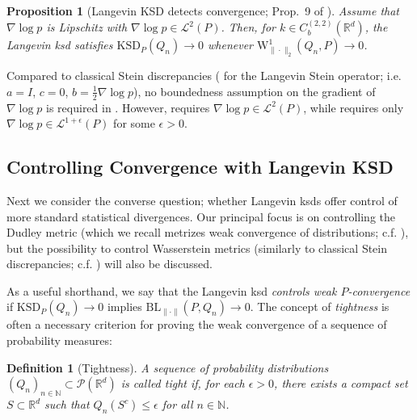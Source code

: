 \documentclass[12pt,paper=letter]{scrreprt}
\newtheorem{proposition}{Proposition}[chapter]
\newtheorem{definition}{Definition}[chapter]
\newcommand{\grad}{\nabla} %
\begin{document}
\begin{proposition}[Langevin KSD detects convergence; Prop.~9 of \citealp{gorham2017measuring}]
\label{prop:ksd-upper-bound}
Assume that $\grad \log p$ is Lipschitz with $\nabla \log p \in \mathcal{L}^2(P)$.
Then, for $k \in C_b^{(2,2)}(\mathbb{R}^d)$, the Langevin \ac{ksd} satisfies
$\mathrm{KSD}_P(Q_n) \to 0$ whenever $\mathrm{W}_{\|\cdot\|_2}^1(Q_n,P)\to 0$.
\end{proposition}

Compared to classical Stein discrepancies ( for the Langevin Stein operator; i.e. $a = I$, $c = 0$, $b = \frac{1}{2} \nabla \log p$), no boundedness assumption on the gradient of $\nabla \log p$ is required in .
However,  requires $\nabla \log p \in \mathcal{L}^2(P)$, while  requires only $\nabla \log p \in \mathcal{L}^{1 + \epsilon}(P)$ for some $\epsilon > 0$.






\subsection{Controlling Convergence with Langevin KSD}
\label{subsec: conv contrl lksd}

Next we consider the converse question; whether Langevin \acp{ksd} offer control of more standard statistical divergences.
Our principal focus is on controlling the Dudley metric (which we recall metrizes weak convergence of distributions; c.f. ), but the possibility to control Wasserstein metrics (similarly to classical Stein discrepancies; c.f. ) will also be discussed. 

As a useful shorthand, we say that the Langevin \ac{ksd} \emph{controls weak $P$-convergence} if $\mathrm{KSD}_P(Q_n) \rightarrow 0$ implies $\mathrm{BL}_{\| \cdot\|}(P,Q_n) \rightarrow 0$.
The concept of \emph{tightness} is often a necessary criterion for proving the weak convergence of a sequence of probability measures:

\begin{definition}[Tightness] \label{def: tight}
    A sequence of probability distributions $(Q_n)_{n \in \mathbb{N}} \subset \mathcal{P}(\mathbb{R}^d)$ is called \emph{tight} if, for each $\epsilon > 0$, there exists a compact set $S \subset \mathbb{R}^d$ such that $Q_n(S^c) \leq \epsilon$ for all $n \in \mathbb{N}$.
\end{definition}
\end{document}
